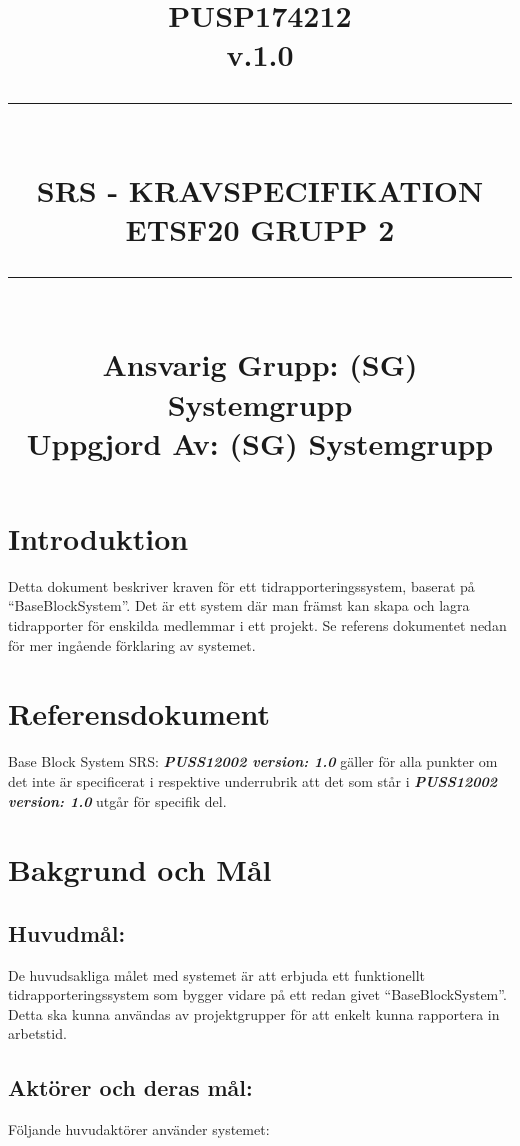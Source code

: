 \documentclass[paper=a4, fontsize=11pt,twoside]{article}
\title{
\documentNumber{#1}																						
\documentVersion{#2}																				
\HRule{0.5pt} \\ %
\LARGE \textbf{\uppercase{#3}} \\
\large \textbf{\uppercase{ETSF20 Grupp 2}} 
\HRule{2pt} \\ [1.5cm]    
\normalsize            
\documentResponsible{#4} \\ 
\documentCreator{#4}  
}
\newcommand{\HRule}[1]{\rule{\linewidth}{#1}}
\newcommand{\documentNumber}[1]{\centering PUSP1742#1 \\[1.0cm]}
\newcommand{\documentVersion}[1]{\centering \small{v.#1} \\[1.0cm]}
\newcommand{\documentResponsible}[1]{\centering  Ansvarig Grupp: #1}
\newcommand{\documentCreator}[1]{\centering Uppgjord Av: #1}
\newcommand{\grouptitlepage}[4]{ 
\title{
\documentNumber{#1}																						
\documentVersion{#2}																				
\HRule{0.5pt} \\ %
\LARGE \textbf{\uppercase{#3}} \\
\large \textbf{\uppercase{ETSF20 Grupp 2}} 
\HRule{2pt} \\ [1.5cm]    
\normalsize            
\documentResponsible{#4} \\ 
\documentCreator{#4}  
}																							
\maketitle																							
\thispagestyle{empty} 																	\newpage 				
 
}
\begin{document}
\grouptitlepage
{12}
{1.0}
{SRS - Kravspecifikation}
{(SG) Systemgrupp}	
\tableofcontents
\section{Introduktion}
Detta dokument beskriver kraven för ett tidrapporteringssystem, baserat på “BaseBlockSystem”. Det är ett system där man främst kan skapa och lagra tidrapporter för enskilda medlemmar i ett projekt. Se referens dokumentet nedan för mer ingående förklaring av systemet.
\section{Referensdokument}
Base Block System SRS: \textbf{\textit{PUSS12002 version: 1.0}}  gäller för alla punkter	 om det inte är specificerat i respektive underrubrik att det som står i \textbf{\textit{PUSS12002 version: 1.0}}  utgår för specifik del.

\newpage
\section{Bakgrund och Mål}
\subsection{Huvudmål:}
De huvudsakliga målet med systemet är att erbjuda ett funktionellt tidrapporteringssystem som bygger vidare på ett redan givet “BaseBlockSystem”. Detta ska kunna användas av projektgrupper för att enkelt kunna rapportera in arbetstid.
\subsection{Aktörer och deras mål:}
Följande huvudaktörer använder systemet:
\end{document}
